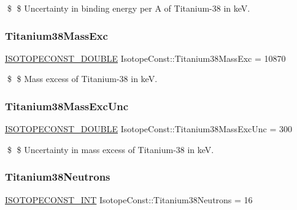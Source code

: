 \$ \$ Uncertainty in binding energy per A of Titanium-\/38 in keV. \mbox{\label{group___isotope_const-_titanium-_ti38_gabeb0164d69f1fae7e9f2637976141149}} 
\subsubsection{\texorpdfstring{Titanium38\+Mass\+Exc}{Titanium38MassExc}}
{\footnotesize\ttfamily \mbox{\hyperlink{group___isotope_const-_macros_ga8f45a7272ce02c0b4c65c44636ed719a}{I\+S\+O\+T\+O\+P\+E\+C\+O\+N\+S\+T\+\_\+\+D\+O\+U\+B\+LE}} Isotope\+Const\+::\+Titanium38\+Mass\+Exc = 10870}

\$ \$ Mass excess of Titanium-\/38 in keV. \mbox{\label{group___isotope_const-_titanium-_ti38_gaa33d428c763cffc7504991f5815acda1}} 
\subsubsection{\texorpdfstring{Titanium38\+Mass\+Exc\+Unc}{Titanium38MassExcUnc}}
{\footnotesize\ttfamily \mbox{\hyperlink{group___isotope_const-_macros_ga8f45a7272ce02c0b4c65c44636ed719a}{I\+S\+O\+T\+O\+P\+E\+C\+O\+N\+S\+T\+\_\+\+D\+O\+U\+B\+LE}} Isotope\+Const\+::\+Titanium38\+Mass\+Exc\+Unc = 300}

\$ \$ Uncertainty in mass excess of Titanium-\/38 in keV. \mbox{\label{group___isotope_const-_titanium-_ti38_ga170ef8328394d8a5bda9f7326dc900d4}} 
\subsubsection{\texorpdfstring{Titanium38\+Neutrons}{Titanium38Neutrons}}
{\footnotesize\ttfamily \mbox{\hyperlink{group___isotope_const-_macros_ga5f18360b3e99483a35c32d789e62621c}{I\+S\+O\+T\+O\+P\+E\+C\+O\+N\+S\+T\+\_\+\+I\+NT}} Isotope\+Const\+::\+Titanium38\+Neutrons = 16}

